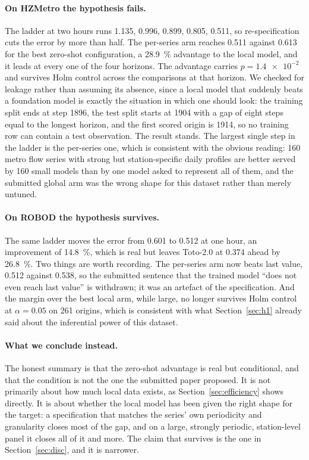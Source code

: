 \documentclass[11pt]{article}
\theoremstyle{plain}
\theoremstyle{definition}
\theoremstyle{remark}
\newif\ifrevisionmarkup
\newcommand{\new}[1]{\ifrevisionmarkup\textcolor{revision}{#1}\else#1\fi}
\begin{document}
\new{\paragraph{On HZMetro the hypothesis fails.} The ladder at two hours runs \num{1.135}, \num{0.996}, \num{0.899}, \num{0.805}, \num{0.511}, so re-specification cuts the error by more than half. The per-series arm reaches \num{0.511} against \num{0.613} for the best zero-shot configuration, a \SI{28.9}{\percent} advantage to the local model, and it leads at every one of the four horizons. The advantage carries $p=\num{1.4e-2}$ and survives Holm control across the comparisons at that horizon. We checked for leakage rather than assuming its absence, since a local model that suddenly beats a foundation model is exactly the situation in which one should look: the training split ends at step \num{1896}, the test split starts at \num{1904} with a gap of eight steps equal to the longest horizon, and the first scored origin is \num{1914}, so no training row can contain a test observation. The result stands. The largest single step in the ladder is the per-series one, which is consistent with the obvious reading: \num{160} metro flow series with strong but station-specific daily profiles are better served by \num{160} small models than by one model asked to represent all of them, and the submitted global arm was the wrong shape for this dataset rather than merely untuned.}

\new{\paragraph{On ROBOD the hypothesis survives.} The same ladder moves the error from \num{0.601} to \num{0.512} at one hour, an improvement of \SI{14.8}{\percent}, which is real but leaves Toto-2.0 at \num{0.374} ahead by \SI{26.8}{\percent}. Two things are worth recording. The per-series arm now beats last value, \num{0.512} against \num{0.538}, so the submitted sentence that the trained model ``does not even reach last value'' is withdrawn; it was an artefact of the specification. And the margin over the best local arm, while large, no longer survives Holm control at $\alpha = 0.05$ on \num{261} origins, which is consistent with what Section~\ref{sec:h1} already said about the inferential power of this dataset.}

\new{\paragraph{What we conclude instead.} The honest summary is that the zero-shot advantage is real but conditional, and that the condition is not the one the submitted paper proposed. It is not primarily about how much local data exists, as Section~\ref{sec:efficiency} shows directly. It is about whether the local model has been given the right shape for the target: a specification that matches the series' own periodicity and granularity closes most of the gap, and on a large, strongly periodic, station-level panel it closes all of it and more. The claim that survives is the one in Section~\ref{sec:disc}, and it is narrower.}
\end{document}
